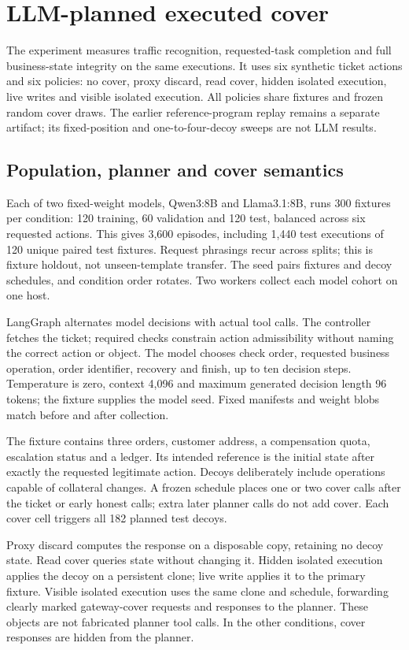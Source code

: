\section{LLM-planned executed cover}\label{supp:cover-study}
The experiment measures traffic recognition, requested-task completion and full business-state integrity on the same executions. It uses six synthetic ticket actions and six policies: no cover, proxy discard, read cover, hidden isolated execution, live writes and visible isolated execution. All policies share fixtures and frozen random cover draws. The earlier reference-program replay remains a separate artifact; its fixed-position and one-to-four-decoy sweeps are not LLM results.

\subsection{Population, planner and cover semantics}
Each of two fixed-weight models, Qwen3:8B and Llama3.1:8B, runs 300 fixtures per condition: 120 training, 60 validation and 120 test, balanced across six requested actions. This gives 3,600 episodes, including 1,440 test executions of 120 unique paired test fixtures. Request phrasings recur across splits; this is fixture holdout, not unseen-template transfer. The seed pairs fixtures and decoy schedules, and condition order rotates. Two workers collect each model cohort on one host.

LangGraph alternates model decisions with actual tool calls. The controller fetches the ticket; required checks constrain action admissibility without naming the correct action or object. The model chooses check order, requested business operation, order identifier, recovery and finish, up to ten decision steps. Temperature is zero, context 4,096 and maximum generated decision length 96 tokens; the fixture supplies the model seed. Fixed manifests and weight blobs match before and after collection.

The fixture contains three orders, customer address, a compensation quota, escalation status and a ledger. Its intended reference is the initial state after exactly the requested legitimate action. Decoys deliberately include operations capable of collateral changes. A frozen schedule places one or two cover calls after the ticket or early honest calls; extra later planner calls do not add cover. Each cover cell triggers all 182 planned test decoys.

Proxy discard computes the response on a disposable copy, retaining no decoy state. Read cover queries state without changing it. Hidden isolated execution applies the decoy on a persistent clone; live write applies it to the primary fixture. Visible isolated execution uses the same clone and schedule, forwarding clearly marked gateway-cover requests and responses to the planner. These objects are not fabricated planner tool calls. In the other conditions, cover responses are hidden from the planner.

